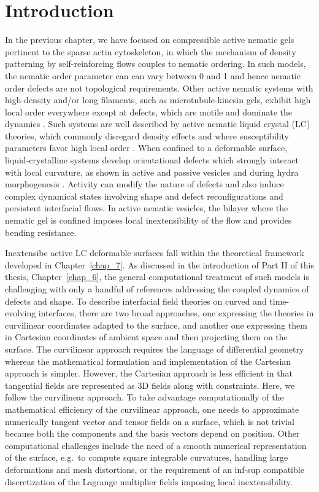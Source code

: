 \section{Introduction}

In the previous chapter, we have focused on compressible active nematic gels pertinent to the sparse actin cytoskeleton, in which the mechanism of density patterning by self-reinforcing flows couples to nematic ordering. In such models,  the nematic order parameter can can vary between 0 and 1 and hence nematic order defects are not topological requirements. Other active nematic systems with high-density and/or long filaments, such as microtubule-kinesin gels, exhibit high local order everywhere except at defects, which are motile and dominate the dynamics  \cite{ndlec1997, surrey2001,sanchez2012}. Such systems are  well described by  active nematic liquid crystal (LC) theories, which commonly disregard density effects and where susceptibility parameters favor high local order \cite{zhang2018,kumar2018}. When confined to a deformable surface, liquid-crystalline systems develop orientational defects which strongly interact with local curvature, as shown in active and passive vesicles \cite{keber2014,xing2012} and during hydra morphogenesis \cite{maroudas2021}. Activity can modify the nature of defects and also induce complex dynamical states involving shape and defect reconfigurations and persistent interfacial flows. In active nematic vesicles, the bilayer where the nematic gel is confined imposes local inextensibility of the flow and provides bending resistance. 

Inextensibe active LC deformable surfaces  fall within the theoretical framework developed in Chapter~\ref{chap_7}. As discussed in the introduction of Part II of this thesis, Chapter~\ref{chap_6}, the general computational treatment of such models is challenging with only a handful of references addressing the coupled dynamics of defects and shape. To describe interfacial field theories on curved and time-evolving interfaces, there are two broad  approaches, one expressing the theories in  curvilinear coordinates adapted to the surface, and another one expressing them in Cartesian coordinates of ambient space and then projecting them on the surface. The curvilinear approach requires the language of differential geometry whereas the mathematical formulation and implementation of the Cartesian approach is simpler. However, the Cartesian approach is less efficient in that tangential fields are represented as 3D fields along with constraints. Here, we follow the curvilinear approach. To take advantage computationally of the mathematical efficiency of the curvilinear approach, one needs to approximate numerically tangent vector and tensor fields on a surface, which is not trivial because both the components and the basis vectors depend on position. Other computational challenges include the need of a smooth numerical representation of the surface, e.g.~to compute square integrable curvatures, handling large deformations and mesh distortions, or the requirement of an inf-sup compatible discretization of the Lagrange multiplier fields imposing local inextensibility. 

